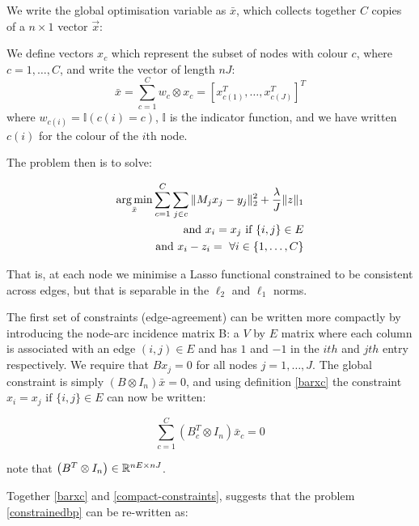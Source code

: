 We write the global optimisation variable as \(\bar{x}\), which collects together \(C\) copies of a \(n\times 1\) vector \(\vec{x}\):

\begin{defn}
We define vectors \(x_c\) which represent the subset of nodes with colour \(c\), where \(c = 1,\ldots , C\), and write the vector of length \(nJ\):
\begin{equation}
\bar{x} = \sum_{c=1}^C w_c \otimes x_c = \left[x_{c(1)}^T, \ldots	, x_{c(J)}^T\right]^T
\label{barxc}
\end{equation}
where \(w_{c(i)} = \mathbb{I}(c(i) = c)\), \(\mathbb{I}\) is the indicator function, and we have written \(c(i)\) for the colour of the \(i\)th node.
\end{defn}

The problem then is to solve:

\begin{align}
\operatorname*{arg\,min}_{\bar{x}} \sum_{c=1}^C \sum_{j \in c} \|M_jx_j - y_j\|_2^2 + \frac{\lambda}{J}\|z\|_1 \nonumber \\ 
\text{ and } x_i = x_j \text{ if } \{i,j\} \in E \nonumber \\
\text{ and } x_i - z_i = \text{ } \forall i \in \{1, \ldots, C\}
\label{constrainedbp}
\end{align}

That is, at each node we minimise a Lasso functional constrained to be consistent across edges, but that is separable in the \(\ell_2\) and \(\ell_1\) norms.

The first set of constraints (edge-agreement) can be written more compactly by introducing the node-arc incidence matrix B: a \(V\) by \(E\) matrix where each column is associated with an edge \(\left(i,j\right) \in E\) and has \(1\) and \(-1\) in the \(ith\) and \(jth\) entry respectively. We require that \( Bx_j = 0 \) for all nodes \(j = 1, \ldots,  J\). The global constraint is simply \( (B \otimes I_n)\bar{x} = 0\), and using definition \eqref{barxc} the constraint \(x_i = x_j \text{ if } \{i,j\} \in E \) can now be written:

\begin{equation}
\sum_{c=1}^C\left(B_c^T \otimes I_n\right)\bar{x}_c = 0
\label{compact-constraints}
\end{equation}

note that \(\left(B^T\otimes I_n \right) \in {\mathbb{R}}^{nE \times nJ}\).

 Together \eqref{barxc} and \eqref{compact-constraints}, suggests that the problem \eqref{constrainedbp} can be re-written as:

